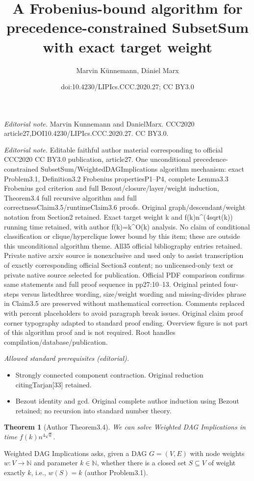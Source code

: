\documentclass[10pt,a4paper]{article}
\title{A Frobenius-bound algorithm for precedence-constrained SubsetSum with exact target weight}
\author{Marvin Künnemann, Dániel Marx}
\date{doi:10.4230/LIPIcs.CCC.2020.27; CC BY3.0}
\newtheorem*{statementtheorem}{Theorem}
\begin{document}
\maketitle
\noindent\textit{Editorial note.} Marvin Kunnemann and DanielMarx. CCC2020 article27,DOI10.4230/LIPIcs.CCC.2020.27. CC BY3.0.\par\medskip
\noindent\textit{Editorial note.} Editable faithful author material corresponding to official CCC2020 CC BY3.0 publication, article27. One unconditional precedence-constrained SubsetSum/WeightedDAGImplications algorithm mechanism: exact Problem3.1, Definition3.2 Frobenius propertiesP1--P4, complete Lemma3.3 Frobenius gcd criterion and full Bezout/closure/layer/weight induction, Theorem3.4 full recursive algorithm and full correctnessClaim3.5/runtimeClaim3.6 proofs. Original graph/descendant/weight notation from Section2 retained. Exact target weight k and f(k)n\textasciicircum{}(4sqrt(k)) running time retained, with author f(k)=k\textasciicircum{}O(k) analysis. No claim of conditional classification or clique/hyperclique lower bound by this item; these are outside this unconditional algorithm theme. All35 official bibliography entries retained. Private native arxiv source is nonexclusive and used only to assist transcription of exactly corresponding official Section3 content; no unlicensed-only text or private native source selected for publication. Official PDF comparison confirms same statements and full proof sequence in pp27:10--13. Original printed four-steps versus listedthree wording, size/weight wording and missing-divides phrase in Claim3.5 are preserved without mathematical correction. Comments replaced with percent placeholders to avoid paragraph break issues. Original claim proof corner typography adapted to standard proof ending. Overview figure is not part of this algorithm proof and is not required. Root handles compilation/database/publication.\par\medskip
\noindent\textit{Allowed standard prerequisites (editorial).}\begin{itemize}
\item Strongly connected component contraction. Original reduction citingTarjan[33] retained.
\item Bezout identity and gcd. Original complete author induction using Bezout retained; no recursion into standard number theory.
\end{itemize}\medskip
\begin{statementtheorem}[Author Theorem3.4]
We can solve Weighted DAG Implications in time $f(k)n^{4\sqrt k}$.
\end{statementtheorem}
Weighted DAG Implications asks, given a DAG $G=(V,E)$ with node weights $w:V\to\mathbb N$ and parameter $k\in\mathbb N$, whether there is a closed set $S\subseteq V$ of weight exactly $k$, i.e., $w(S)=k$ (author Problem3.1).
\end{document}

